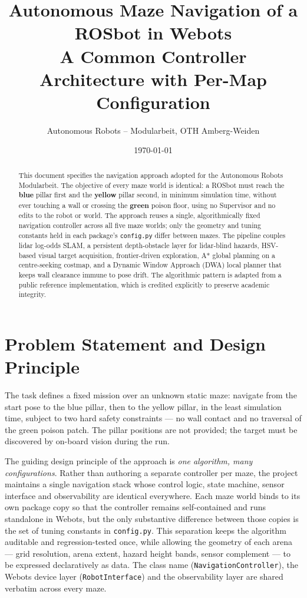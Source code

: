 \documentclass[11pt,a4paper]{article}
\title{\vspace{-1.2cm}\textbf{Autonomous Maze Navigation of a ROSbot in Webots}\\[0.3em]
\large A Common Controller Architecture with Per-Map Configuration}
\author{Autonomous Robots -- Modularbeit, OTH Amberg-Weiden}
\date{\today}
\newcommand{\code}[1]{\colorbox{codegray}{\texttt{\small #1}}}
\begin{document}
\maketitle
\vspace{-0.8cm}

\begin{abstract}
\noindent This document specifies the navigation approach adopted for the
Autonomous Robots Modularbeit. The objective of every maze world is identical:
a ROSbot must reach the \textbf{blue} pillar first and the \textbf{yellow}
pillar second, in minimum simulation time, without ever touching a wall or
crossing the \textbf{green} poison floor, using no Supervisor and no edits to
the robot or world. The approach reuses a single, algorithmically fixed
navigation controller across all five maze worlds; only the geometry and
tuning constants held in each package's \code{config.py} differ between mazes.
The pipeline couples lidar log-odds SLAM, a persistent depth-obstacle layer for
lidar-blind hazards, HSV-based visual target acquisition, frontier-driven
exploration, A* global planning on a centre-seeking costmap, and a Dynamic
Window Approach (DWA) local planner that keeps wall clearance immune to pose
drift. The algorithmic pattern is adapted from a public reference
implementation, which is credited explicitly to preserve academic integrity.
\end{abstract}

\section{Problem Statement and Design Principle}

The task defines a fixed mission over an unknown static maze: navigate from the
start pose to the blue pillar, then to the yellow pillar, in the least
simulation time, subject to two hard safety constraints --- no wall contact and
no traversal of the green poison patch. The pillar positions are not provided;
the target must be discovered by on-board vision during the run.

The guiding design principle of the approach is \emph{one algorithm, many
configurations}. Rather than authoring a separate controller per maze, the
project maintains a single navigation stack whose control logic, state machine,
sensor interface and observability are identical everywhere. Each maze world
binds to its own package copy so that the controller remains self-contained and
runs standalone in Webots, but the only substantive difference between those
copies is the set of tuning constants in \code{config.py}. This separation
keeps the algorithm auditable and regression-tested once, while allowing the
geometry of each arena --- grid resolution, arena extent, hazard height bands,
sensor complement --- to be expressed declaratively as data. The class name
(\code{NavigationController}), the Webots device layer
(\code{RobotInterface}) and the observability layer are shared verbatim across
every maze.
\end{document}
